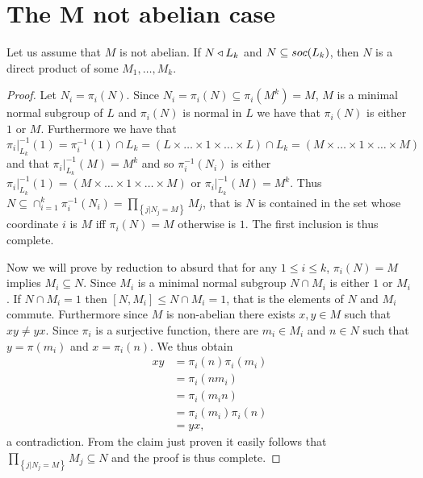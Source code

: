 \section{The M not abelian case}

\begin{theorem}
    \label{S4:Ndp}
    Let us assume that $M$ is not abelian. If $N \triangleleft L_k$ and $N \subseteq soc {(L_k)}$, then $N$ is a direct product of some $M_1,\ldots ,M_k$.
\end{theorem}

\begin{proof}
    Let $N_i = \pi_i(N)$. Since $N_i = \pi_i(N) \subseteq \pi_i(M^k) = M$, $M$ is a minimal normal subgroup of $L$ and $\pi_i(N)$ is normal in $L$ we have that $\pi_i(N)$ is either $1$ or $M$.
    Furthermore we have that $\pi_i|_{L_k}^{-1}(1) = \pi_i^{-1}(1) \cap L_k = (L \times \ldots  \times 1 \times \ldots \times L) \cap L_k = (M \times \ldots  \times 1 \times \ldots  \times M)$ and that $\pi_i|_{L_k}^{-1}(M) = M^k$ and so $\pi_i^{-1}(N_i)$ is either $\pi_i|_{L_k}^{-1}(1) = (M \times \ldots  \times 1 \times \ldots  \times M)$ or $\pi_i|_{L_k}^{-1}(M) = M^k$.
    Thus $N \subseteq \cap_{i=1}^k \pi_i^{-1}(N_i) = \prod_{\left\{j | N_j = M \right\}} M_j$, that is $N$ is contained in the set whose coordinate $i$ is $M$ iff $\pi_i(N) = M$ otherwise is $1$. The first inclusion is thus complete.

    Now we will prove by reduction to absurd that for any $1 \le i \le k$, $\pi_i(N) = M$ implies $M_i \subseteq N$. Since $M_i$ is a minimal normal subgroup $N \cap M_i$ is either $1$ or $M_i$. If $N \cap M_i = 1$ then $[N, M_i] \le N \cap M_i = 1$, that is the elements of $N$ and $M_i$ commute. Furthermore since $M$ is non-abelian there exists $x,y \in M$ such that $xy \ne yx$. Since $\pi_i$ is a surjective function, there are $m_i \in M_i$ and $n \in N$ such that $y= \pi(m_i)$ and $x = \pi_i(n)$. We thus obtain 
    \begin{align*}
        xy &= \pi_i(n)\pi_i(m_i) \\ 
           &= \pi_i(nm_i) \\
           &= \pi_i(m_in) \\
           &= \pi_i(m_i)\pi_i(n) \\
           &=yx,
    \end{align*}
    a contradiction.
    From the claim just proven it easily follows that $\prod_{\left\{j | N_j = M \right\}} M_j \subseteq N$ and the proof is thus complete.

\end{proof}

